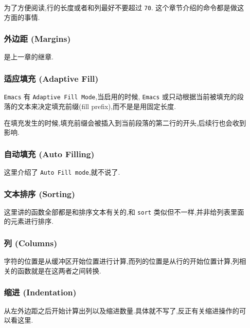 \documentclass[11pt]{article}
\begin{document}
为了方便阅读,行的长度或者和列最好不要超过 \texttt{70}. 这个章节介绍的命令都是做这方面的事情.


\subsubsection{外边距 (Margins)}
\label{sec:org47b3e3e}

是上一章的继章.


\subsubsection{适应填充 (Adaptive Fill)}
\label{sec:org473f268}

\texttt{Emacs} 有 \texttt{Adaptive Fill Mode},当启用的时候, \texttt{Emacs} 或只动根据当前被填充的段落的文本来决定填充前缀(fill prefix),而不是是用固定长度.

在填充发生的时候,填充前缀会被插入到当前段落的第二行的开头,后续行也会收到影响.


\subsubsection{自动填充 (Auto Filling)}
\label{sec:org1d84c7e}

这里介绍了 \texttt{Auto Fill mode},就不说了.


\subsubsection{文本排序 (Sorting)}
\label{sec:org3b306a8}

这里讲的函数全部都是和排序文本有关的,和 \texttt{sort} 类似但不一样,并非给列表里面的元素进行排序.


\subsubsection{列 (Columns)}
\label{sec:orgcef3ca9}

字符的位置是从缓冲区开始位置进行计算,而列的位置是从行的开始位置计算,列相关的函数就是在这两者之间转换.



\subsubsection{缩进 (Indentation)}
\label{sec:org31cb687}

从左外边距之后开始计算出列以及缩进数量.具体就不写了,反正有关缩进操作的可以看这里.
\end{document}

